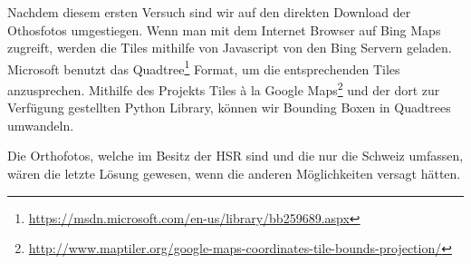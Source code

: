 Nachdem diesem ersten Versuch sind wir auf den direkten Download der Othosfotos umgestiegen. Wenn man mit dem Internet Browser auf Bing Maps zugreift, werden die \Gls{Tile}s mithilfe von Javascript von den Bing Servern geladen. Microsoft benutzt das Quadtree\footnote{\url{https://msdn.microsoft.com/en-us/library/bb259689.aspx}} Format, um die entsprechenden Tiles anzusprechen. Mithilfe des Projekts Tiles à la Google Maps\footnote{\url{http://www.maptiler.org/google-maps-coordinates-tile-bounds-projection/}} und der dort zur Verfügung gestellten Python Library, können wir Bounding Boxen in Quadtrees umwandeln.

Die Orthofotos, welche im Besitz der HSR sind und die nur die Schweiz umfassen, wären die letzte Lösung gewesen, wenn die anderen Möglichkeiten versagt hätten.